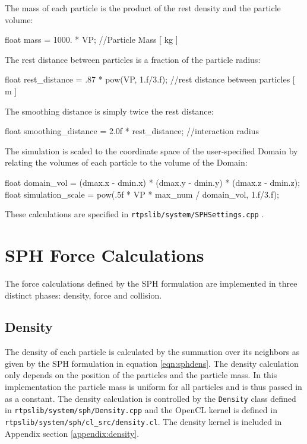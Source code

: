 The mass of each particle is the product of the rest density and the particle volume:
\begin{cppcode}{0}
float mass = 1000. * VP;                         //Particle Mass [ kg ]
\end{cppcode}

The rest distance between particles is a fraction of the particle radius:
\begin{cppcode}{0}
float rest_distance = .87 * pow(VP, 1.f/3.f);   //rest distance between particles [ m ]
\end{cppcode}

The smoothing distance is simply twice the rest distance:
\begin{cppcode}{0}
float smoothing_distance = 2.0f * rest_distance; //interaction radius
\end{cppcode}

The simulation is scaled to the coordinate space of the user-specified Domain
by relating the volumes of each particle to the volume of the Domain:
\begin{cppcode}{0}
float domain_vol = (dmax.x - dmin.x) * (dmax.y - dmin.y) * (dmax.z - dmin.z);
float simulation_scale = pow(.5f * VP * max_num / domain_vol, 1.f/3.f);
\end{cppcode}

These calculations are specified in \verb|rtpslib/system/SPHSettings.cpp| \cite{Krog2010}.


\section{SPH Force Calculations}
The force calculations defined by the SPH formulation are implemented in three
distinct phases: density, force and collision.

\subsection{Density}
The density of each particle is calculated by the summation over its neighbors
as given by the SPH formulation in equation \ref{eqn:sphdens}. The density
calculation only depends on the position of the particles and the particle
mass. In this implementation the particle mass is uniform for all particles and
is thus passed in as a constant.  The density calculation is controlled by the
\verb|Density| class defined in \verb|rtpslib/system/sph/Density.cpp| and the
OpenCL kernel is defined in \verb|rtpslib/system/sph/cl_src/density.cl|. The
density kernel is included in Appendix section \ref{appendix:density}.

